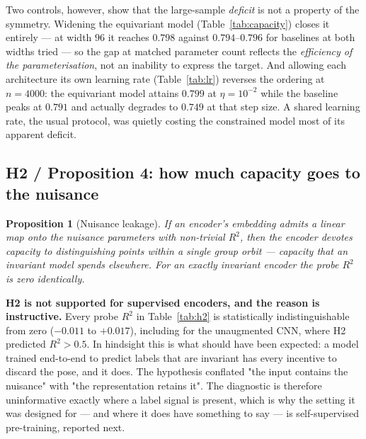 \documentclass[11pt]{article}
\newtheorem{proposition}[theorem]{Proposition}
\theoremstyle{definition}
\begin{document}
Two controls, however, show that the large-sample \emph{deficit} is not a property of
the symmetry. Widening the equivariant model (Table~\ref{tab:capacity}) closes it
entirely --- at width $96$ it reaches $0.798$ against $0.794$--$0.796$ for baselines at
both widths tried --- so the gap at matched parameter count reflects the
\emph{efficiency of the parameterisation}, not an inability to express the target.
And allowing each architecture its own learning rate (Table~\ref{tab:lr}) reverses the
ordering at $n = 4000$: the equivariant model attains $0.799$ at $\eta = 10^{-2}$ while
the baseline peaks at $0.791$ and actually degrades to $0.749$ at that step size. A
shared learning rate, the usual protocol, was quietly costing the constrained model
most of its apparent deficit.

\subsection{H2 / Proposition 4: how much capacity goes to the nuisance}

\begin{proposition}[Nuisance leakage]\label{prop:probe}
If an encoder's embedding admits a linear map onto the nuisance parameters with
non-trivial $R^2$, then the encoder devotes capacity to distinguishing points within a
single group orbit --- capacity that an invariant model spends elsewhere. For an
exactly invariant encoder the probe $R^2$ is zero identically.
\end{proposition}

\begin{table}[t]\centering
\caption{Held-out $R^2$ of a ridge probe predicting the applied nuisance rotation from
each \emph{supervised} encoder's embedding.}
\label{tab:h2}

\end{table}

\textbf{H2 is not supported for supervised encoders, and the reason is instructive.}
Every probe $R^2$ in Table~\ref{tab:h2} is statistically indistinguishable from zero
($-0.011$ to $+0.017$), including for the unaugmented CNN, where H2 predicted
$R^2 > 0.5$. In hindsight this is what should have been expected: a model trained
end-to-end to predict labels that are invariant has every incentive to discard the
pose, and it does. The hypothesis conflated "the input contains the nuisance" with
"the representation retains it". The diagnostic is therefore uninformative exactly
where a label signal is present, which is why the setting it was designed for --- and
where it does have something to say --- is self-supervised pre-training, reported
next.
\end{document}

